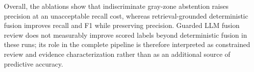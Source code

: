 Overall, the ablations show that indiscriminate gray-zone abstention raises precision at an unacceptable recall cost, whereas retrieval-grounded deterministic fusion improves recall and F1 while preserving precision. Guarded LLM fusion review does not measurably improve scored labels beyond deterministic fusion in these runs; its role in the complete pipeline is therefore interpreted as constrained review and evidence characterization rather than as an additional source of predictive accuracy.
